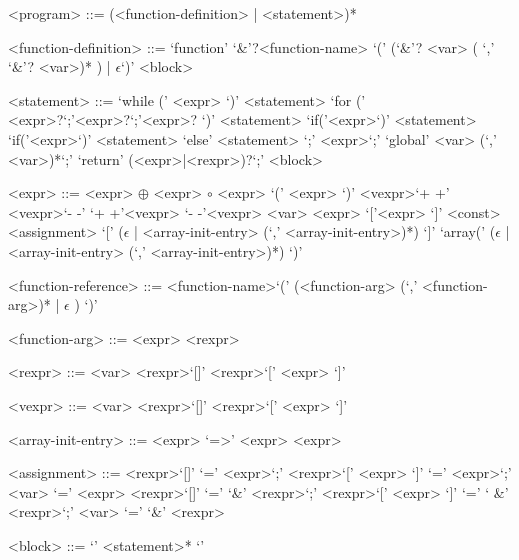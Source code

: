 \begin{grammar}
<program> ::= (<function-definition> | <statement>)*
\end{grammar}
\begin{grammar}
<function-definition> ::= `function' `&'?<function-name> `(' (`&'? <var> ( `,' `&'? <var>)* ) | $\epsilon$`)' <block>
\end{grammar}
\begin{grammar}
<statement> ::= `while (' <expr> `)' <statement>
\alt `for (' <expr>?`;'<expr>?`;'<expr>? `)' <statement>
\alt `if('<expr>`)' <statement>
\alt `if('<expr>`)' <statement> `else' <statement>
\alt `;'
\alt <expr>`;'
\alt `global' <var> (`,' <var>)*`;'
\alt `return' (<expr>|<rexpr>)?`;'
\alt <block>
\end{grammar}
\begin{grammar}
<expr> ::= <expr> $\oplus$ <expr>
\alt $\circ$ <expr>
\alt `(' <expr> `)'
\alt <vexpr>`+ +'
\alt <vexpr>`- -'
\alt `+ +'<vexpr>
\alt `- -'<vexpr>
\alt <var>
\alt <expr> `['<expr> `]'
\alt <const>
\alt <assignment>
\alt `[' ($\epsilon$ | <array-init-entry> (`,' <array-init-entry>)*) `]'
\alt `array(' ($\epsilon$ | <array-init-entry> (`,' <array-init-entry>)*) `)'
\end{grammar}
\begin{grammar}
<function-reference> ::= <function-name>`(' (<function-arg> (`,' <function-arg>)* | $\epsilon$ ) `)'
\end{grammar}
\begin{grammar}
<function-arg> ::= <expr> 
\alt <rexpr> 
\end{grammar}
\begin{grammar}
<rexpr> ::= <var> 
\alt <rexpr>`[]'
\alt <rexpr>`[' <expr> `]'
\end{grammar}
\begin{grammar}
<vexpr> ::= <var> 
\alt <rexpr>`[]'
\alt <rexpr>`[' <expr> `]'
\end{grammar}
\begin{grammar}
<array-init-entry> ::= <expr> `=>' <expr> 
\alt <expr>
\end{grammar}
\begin{grammar}
<assignment> ::= <rexpr>`[]'  `=' <expr>`;'
\alt <rexpr>`[' <expr> `]'  `=' <expr>`;'
\alt <var> `=' <expr>
\alt <rexpr>`[]'  `=' `&' <rexpr>`;'
\alt <rexpr>`[' <expr> `]'  `=' ` &' <rexpr>`;'
\alt <var> `=' `&' <rexpr>
\end{grammar}

\begin{grammar}
<block> ::= `{' <statement>* `}'
\end{grammar}